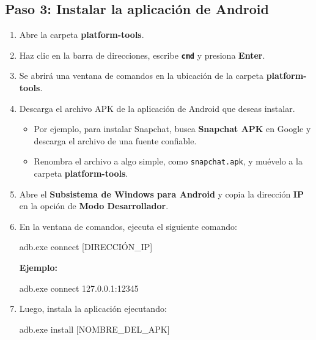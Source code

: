 \documentclass[
  doc,
  floatsintext,
  longtable,
  a4paper,
  nolmodern,
  notxfonts,
  notimes,
  12pt,
  colorlinks=true,linkcolor=blue,citecolor=blue,urlcolor=blue]{apa7}
\newenvironment{Shaded}{\begin{snugshade}}{\end{snugshade}}
\newcommand{\ExtensionTok}[1]{\textcolor[rgb]{0.00,0.23,0.31}{#1}}
\newcommand{\NormalTok}[1]{\textcolor[rgb]{0.00,0.23,0.31}{#1}}
\newcommand{\PreprocessorTok}[1]{\textcolor[rgb]{0.68,0.00,0.00}{#1}}
\newcommand{\SpecialStringTok}[1]{\textcolor[rgb]{0.13,0.47,0.30}{#1}}
\providecommand{\tightlist}{%
  \setlength{\itemsep}{0pt}\setlength{\parskip}{0pt}}
\begin{document}
\subsection{Paso 3: Instalar la aplicación de
Android}\label{paso-3-instalar-la-aplicaciuxf3n-de-android}

\begin{enumerate}
\def\labelenumi{\arabic{enumi}.}
\item
  Abre la carpeta \textbf{platform-tools}.
\item
  Haz clic en la barra de direcciones, escribe \textbf{\texttt{cmd}} y
  presiona \textbf{Enter}.
\item
  Se abrirá una ventana de comandos en la ubicación de la carpeta
  \textbf{platform-tools}.
\item
  Descarga el archivo APK de la aplicación de Android que deseas
  instalar.

  \begin{itemize}
  \tightlist
  \item
    Por ejemplo, para instalar Snapchat, busca \textbf{Snapchat APK} en
    Google y descarga el archivo de una fuente confiable.
  \item
    Renombra el archivo a algo simple, como \texttt{snapchat.apk}, y
    muévelo a la carpeta \textbf{platform-tools}.
  \end{itemize}
\item
  Abre el \textbf{Subsistema de Windows para Android} y copia la
  dirección \textbf{IP} en la opción de \textbf{Modo Desarrollador}.
\item
  En la ventana de comandos, ejecuta el siguiente comando:

\begin{Shaded}
\begin{Highlighting}[]
\ExtensionTok{adb.exe}\NormalTok{ connect }\PreprocessorTok{[}\SpecialStringTok{DIRECCIÓN\_IP}\PreprocessorTok{]}
\end{Highlighting}
\end{Shaded}

  \textbf{Ejemplo:}

\begin{Shaded}
\begin{Highlighting}[]
\ExtensionTok{adb.exe}\NormalTok{ connect 127.0.0.1:12345}
\end{Highlighting}
\end{Shaded}
\item
  Luego, instala la aplicación ejecutando:

\begin{Shaded}
\begin{Highlighting}[]
\ExtensionTok{adb.exe}\NormalTok{ install }\PreprocessorTok{[}\SpecialStringTok{NOMBRE\_DEL\_APK}\PreprocessorTok{]}
\end{Highlighting}
\end{Shaded}


\end{enumerate}
\end{document}
